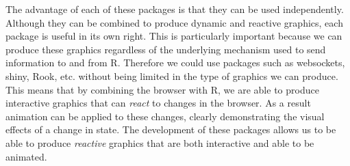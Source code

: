 \documentclass[11pt, a4paper]{article}
\newcommand{\R}{\textsf{R}}
\newcommand{\pkg}[1]{\textsf{#1}}
\begin{document}
The advantage of each of these packages is that they can be used
independently. Although they can be combined to produce dynamic and
reactive graphics, each package is useful in its own right. This is
particularly important because we can produce these graphics
regardless of the underlying mechanism used to send information to and
from \R{}. Therefore we could use packages such as \pkg{websockets},
\pkg{shiny}, \pkg{Rook}, etc. without being limited in the type of
graphics we can produce. This means that by combining the browser with
\R{}, we are able to produce interactive graphics that can
\emph{react} to changes in the browser. As a result animation can be
applied to these changes, clearly demonstrating the visual effects of
a change in state. The development of these packages allows us to be
able to produce \emph{reactive} graphics that are both interactive and
able to be animated.
\end{document}
